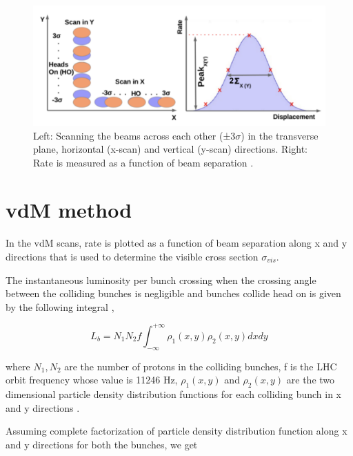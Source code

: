\begin{figure}[h]
    \centering
    \includegraphics[width=1\textwidth]{ashish_thesis/vdm_method_new.png}
    \caption[vdM scan schematic]{Left: Scanning the beams across each other (±3$\sigma$) in the transverse plane, horizontal (x-scan) and vertical (y-scan) directions. Right: Rate is measured as a function of beam separation \cite{karacheban2017luminosity}.}
    \label{fig:vdm_scan_method}
\end{figure}

\section{vdM method}

In the vdM scans, rate is plotted as a function of beam separation along x and y directions that is used to determine the visible cross section $\sigma_{vis}$.

The instantaneous luminosity per bunch crossing when the crossing angle between the colliding bunches is negligible and bunches collide head on is given by the following integral \cite{CMS-PAS-LUM-13-001}, 

\begin{equation}
L_{b} = N_1 N_2 f \int^{+\infty}_{-\infty} \rho_1(x,y) \rho_2(x, y) dx dy 
\end{equation}

where $N_1, N_2$ are the number of protons in the colliding bunches, f is the LHC orbit frequency whose value is 11246 Hz,  $\rho_1(x,y)$ and $\rho_2(x,y)$ are the two dimensional particle density distribution functions for each colliding bunch in x and y directions  \cite{CMS-PAS-LUM-17-004}. 

Assuming complete factorization of particle density distribution function along x and y directions for both the bunches, we get 

